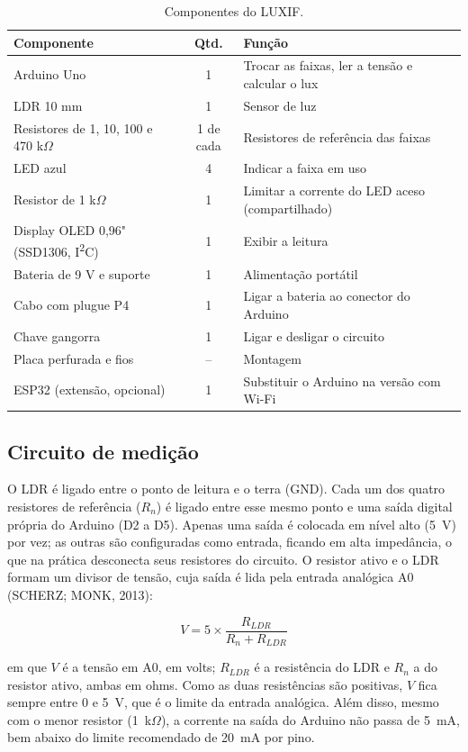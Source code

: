 \documentclass[11pt,a4paper]{article}
\begin{document}
\begin{table}[H]
	\centering
	\caption{Componentes do LUXIF.}
	\label{tab:componentes}
	\small
	\begin{tabular}{lcl}
		\toprule
		Componente & Qtd. & Função \\
		\midrule
		Arduino Uno & 1 & Trocar as faixas, ler a tensão e calcular o lux \\
		LDR 10 mm & 1 & Sensor de luz \\
		Resistores de 1, 10, 100 e 470 k$\Omega$ & 1 de cada & Resistores de referência das faixas \\
		LED azul & 4 & Indicar a faixa em uso \\
		Resistor de 1 k$\Omega$ & 1 & Limitar a corrente do LED aceso (compartilhado) \\
		Display OLED 0,96" (SSD1306, I\textsuperscript{2}C) & 1 & Exibir a leitura \\
		Bateria de 9 V e suporte & 1 & Alimentação portátil \\
		Cabo com plugue P4 & 1 & Ligar a bateria ao conector do Arduino \\
		Chave gangorra & 1 & Ligar e desligar o circuito \\
		Placa perfurada e fios & -- & Montagem \\
		ESP32 (extensão, opcional) & 1 & Substituir o Arduino na versão com Wi-Fi \\
		\bottomrule
	\end{tabular}
\end{table}

\subsection*{Circuito de medição}

O LDR é ligado entre o ponto de leitura e o terra (GND). Cada um dos quatro resistores de referência ($R_n$) é ligado entre esse mesmo ponto e uma saída digital própria do Arduino (D2 a D5). Apenas uma saída é colocada em nível alto (5~V) por vez; as outras são configuradas como entrada, ficando em alta impedância, o que na prática desconecta seus resistores do circuito. O resistor ativo e o LDR formam um divisor de tensão, cuja saída é lida pela entrada analógica A0 (SCHERZ; MONK, 2013):

\begin{equation}
	V = 5 \times \frac{R_{LDR}}{R_n + R_{LDR}}
	\label{eq:divisor}
\end{equation}

\noindent em que $V$ é a tensão em A0, em volts; $R_{LDR}$ é a resistência do LDR e $R_n$ a do resistor ativo, ambas em ohms. Como as duas resistências são positivas, $V$ fica sempre entre 0 e 5~V, que é o limite da entrada analógica. Além disso, mesmo com o menor resistor (1~k$\Omega$), a corrente na saída do Arduino não passa de 5~mA, bem abaixo do limite recomendado de 20~mA por pino.
\end{document}
